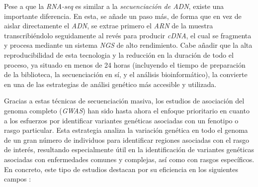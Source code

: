 \documentclass[IB,BIB]{TFUOC}%
\begin{document}
\normalsize

Pese a que la \textit{RNA-seq} es similar a la \textit{secuenciación de ADN}, existe una importante diferencia. En esta, se añade un paso más, de forma que en vez de aislar directamente el \textit{ADN}, se extrae primero el \textit{ARN} de la muestra transcribiéndolo seguidamente al revés para producir \textit{cDNA}, el cual se fragmenta y procesa mediante un sistema \textit{NGS} de alto rendimiento. Cabe añadir que la alta reproducibilidad de esta tecnologia y la reducción en la duración de todo el proceso, ya situado en menos de 24 horas (incluyendo el tiempo de preparación de la biblioteca, la secuenciación en sí, y el análisis bioinformático), la convierte en una de las estrategias de análisi genético más accesible y utilizada.

Gracias a estas técnicas de secuenciación masiva, los estudios de asociación del genoma completo (\textit{GWAS}) han sido hasta ahora el enfoque prioritario en cuanto a los esfuerzos por identificar variantes genéticas asociadas con un fenotipo o rasgo particular. Esta estrategia analiza la variación genética en todo el genoma de un gran número de individuos para identificar regiones asociadas con el rasgo de interés, resultando especialmente útil en la identificación de variantes genéticas asociadas con enfermedades comunes y complejas, así como con rasgos específicos. En concreto, este tipo de estudios destacan por su eficiencia en los siguientes campos \cite{tam_benefits_2019, garrido_martin_multivariate_2020, qi_genetic_2022, turner_quality_2011, noauthor_genome-wide_2023}:

\footnotesize
\end{document}
